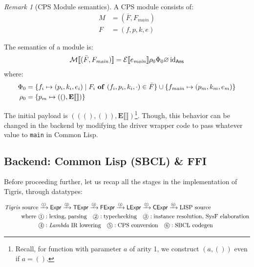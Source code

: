 \documentclass[a4paper, 11pt]{article}
\theoremstyle{remark}\newtheorem*{remark}{Remark}
\theoremstyle{definition}\newtheorem*{definition}{Definition}
\begin{document}
\begin{remark}[CPS Module semantics]
A CPS module consists of:
\begin{align*}
  M &= (\bar{F}, F_{\mathit{main}}) \\
  F &= (f, p, k, e)
\end{align*}

The semantics of a module is:
\[
  \mathcal{M}\llbracket (\bar{F}, F_{\mathit{main}}) \rrbracket =
  \mathcal{E}\llbracket e_{\mathit{main}} \rrbracket\rho_0\Phi_0\varnothing\,\mathrm{id}_\mathsf{Ans}
\]
where:
\begin{align*}
  \FunTab_0 &= \{f_i \mapsto (p_i, k_i, e_i) \mid F_i\ \mathbf{of}\ (f_i, p_i, k_i, \cdot) \in \bar{F}\} \cup \{f_{\mathit{main}} \mapsto (p_m, k_m, e_m)\} \\
  \Env_0 &= \{p_m \mapsto (\unit, \mathbf{E}\llbracket\rrbracket)\}
\end{align*}

The initial payload is $(((), ()), \mathbf{E}\llbracket\rrbracket)$\footnote{
  Recall, for function with parameter $a$ of arity 1, we construct $(a, ())$ even if
  $a = ()$.
}. Though, this behavior can be changed in the backend by modifying the driver wrapper code to pass
whatever value to \texttt{main} in Common Lisp.
\end{remark}

\subsection{Backend: Common Lisp (SBCL) \& FFI}\label{sect:ffi}
Before proceeding further, let us recap all the stages in the implementation of Tigris, through datatypes:

\begin{align*}
\text{\Tigris source}&
\xrightarrow{\text{\textcircled{\tiny 1}}}\mathsf{Expr}
\xrightarrow{\text{\textcircled{\tiny 2}}}\mathsf{TExpr}
\xrightarrow{\text{\textcircled{\tiny 3}}}\mathsf{FExpr}
\xrightarrow{\text{\textcircled{\tiny 4}}}\mathsf{LExpr}
\xrightarrow{\text{\textcircled{\tiny 5}}}\mathsf{CExpr}
\xrightarrow{\text{\textcircled{\tiny 6}}}\text{LISP source}\\
\text{where}\
&\text{\textcircled{\footnotesize 1}}:\text{lexing, parsing}
\quad\text{\textcircled{\footnotesize 2}}:\text{typechecking}
\quad\text{\textcircled{\footnotesize 3}}:\text{instance resolution, SysF elaboration}\\
&\text{\textcircled{\footnotesize 4}}:\text{\Lambdair lowering}
\quad\text{\textcircled{\footnotesize 5}}:\text{CPS conversion}
\quad\text{\textcircled{\footnotesize 6}}:\text{SBCL codegen}
\end{align*}
\end{document}
